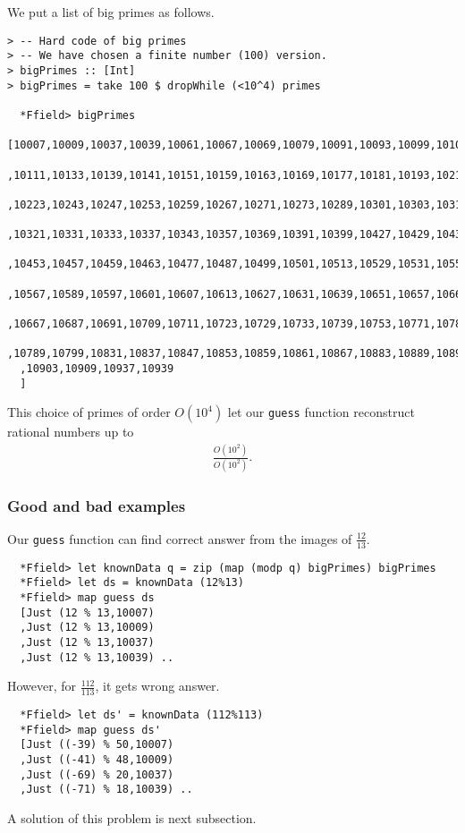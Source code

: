 \documentclass[11pt]{book}
\begin{document}
We put a list of big primes as follows.
\begin{verbatim}
> -- Hard code of big primes
> -- We have chosen a finite number (100) version.
> bigPrimes :: [Int]
> bigPrimes = take 100 $ dropWhile (<10^4) primes

  *Ffield> bigPrimes 
  [10007,10009,10037,10039,10061,10067,10069,10079,10091,10093,10099,10103
  ,10111,10133,10139,10141,10151,10159,10163,10169,10177,10181,10193,10211
  ,10223,10243,10247,10253,10259,10267,10271,10273,10289,10301,10303,10313
  ,10321,10331,10333,10337,10343,10357,10369,10391,10399,10427,10429,10433
  ,10453,10457,10459,10463,10477,10487,10499,10501,10513,10529,10531,10559
  ,10567,10589,10597,10601,10607,10613,10627,10631,10639,10651,10657,10663
  ,10667,10687,10691,10709,10711,10723,10729,10733,10739,10753,10771,10781
  ,10789,10799,10831,10837,10847,10853,10859,10861,10867,10883,10889,10891
  ,10903,10909,10937,10939
  ]
\end{verbatim}
This choice of primes of order $O(10^4)$ let our \verb+guess+ function reconstruct rational numbers up to
\begin{eqnarray}
\frac{O(10^2)}{O(10^2)}.
\end{eqnarray}

\subsubsection{Good and bad examples}
Our \verb+guess+ function can find correct answer from the images of $\frac{12}{13}$.
\begin{verbatim}
  *Ffield> let knownData q = zip (map (modp q) bigPrimes) bigPrimes
  *Ffield> let ds = knownData (12%13)
  *Ffield> map guess ds
  [Just (12 % 13,10007)
  ,Just (12 % 13,10009)
  ,Just (12 % 13,10037)
  ,Just (12 % 13,10039) ..
\end{verbatim}
However, for $\frac{112}{113}$, it gets wrong answer.
\begin{verbatim}
  *Ffield> let ds' = knownData (112%113)
  *Ffield> map guess ds'
  [Just ((-39) % 50,10007)
  ,Just ((-41) % 48,10009)
  ,Just ((-69) % 20,10037)
  ,Just ((-71) % 18,10039) ..
\end{verbatim}

A solution of this problem is next subsection.
\end{document}
